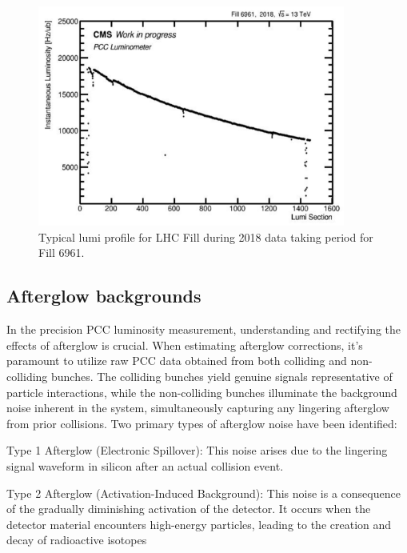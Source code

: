 \begin{figure}[!htp]
    \centering
    \includegraphics[width=0.9\textwidth]{ashish_thesis/Fill_profile_6961_1.png}
    \caption[Fill 6961 Profile]{Typical lumi profile for LHC Fill during 2018 data taking period for Fill 6961.}
    \label{fig:Fill6961}
\end{figure}


\newpage
\subsection{Afterglow backgrounds}

In the precision PCC luminosity measurement, understanding and rectifying the effects of afterglow is crucial. When estimating afterglow corrections, it's paramount to utilize raw PCC data obtained from both colliding and non-colliding bunches. The colliding bunches yield genuine signals representative of particle interactions, while the non-colliding bunches illuminate the background noise inherent in the system, simultaneously capturing any lingering afterglow from prior collisions. Two primary types of afterglow noise have been identified:

Type 1 Afterglow (Electronic Spillover): This noise arises due to the lingering signal waveform in silicon after an actual collision event.

Type 2 Afterglow (Activation-Induced Background): This noise is a consequence of the gradually diminishing activation of the detector. It occurs when the detector material encounters high-energy particles, leading to the creation and decay of radioactive isotopes \cite{CMS-PAS-SMP-12-008} %

